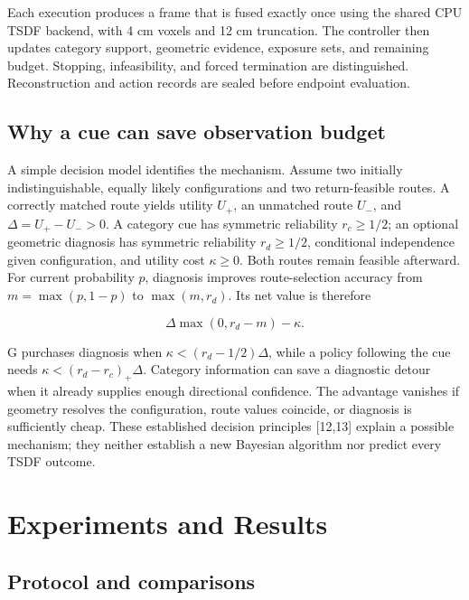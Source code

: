 \documentclass[11pt,a4paper]{article}
\begin{document}
Each execution produces a frame that is fused exactly once using the shared CPU TSDF backend, with 4 cm voxels and 12 cm truncation. The controller then updates category support, geometric evidence, exposure sets, and remaining budget. Stopping, infeasibility, and forced termination are distinguished. Reconstruction and action records are sealed before endpoint evaluation.

\hypertarget{why-a-cue-can-save-observation-budget}{%
\subsection{Why a cue can save observation budget}\label{why-a-cue-can-save-observation-budget}}

A simple decision model identifies the mechanism. Assume two initially indistinguishable, equally likely configurations and two return-feasible routes. A correctly matched route yields utility \(U_+\), an unmatched route \(U_-\), and \(\Delta=U_+-U_->0\). A category cue has symmetric reliability \(r_c\ge1/2\); an optional geometric diagnosis has symmetric reliability \(r_d\ge1/2\), conditional independence given configuration, and utility cost \(\kappa\ge0\). Both routes remain feasible afterward. For current probability \(p\), diagnosis improves route-selection accuracy from \(m=\max(p,1-p)\) to \(\max(m,r_d)\). Its net value is therefore

\[
\Delta\max(0,r_d-m)-\kappa.
\]

G purchases diagnosis when \(\kappa<(r_d-1/2)\Delta\), while a policy following the cue needs \(\kappa<(r_d-r_c)_+\Delta\). Category information can save a diagnostic detour when it already supplies enough directional confidence. The advantage vanishes if geometry resolves the configuration, route values coincide, or diagnosis is sufficiently cheap. These established decision principles {[}12,13{]} explain a possible mechanism; they neither establish a new Bayesian algorithm nor predict every TSDF outcome.

\hypertarget{experiments-and-results}{%
\section{Experiments and Results}\label{experiments-and-results}}

\hypertarget{protocol-and-comparisons}{%
\subsection{Protocol and comparisons}\label{protocol-and-comparisons}}
\end{document}
